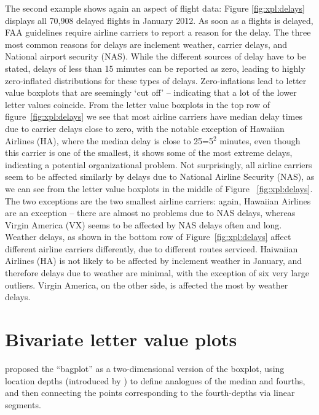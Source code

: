 \documentclass[12pt,oneside]{article}
\begin{document}
The second example shows again an aspect of flight data: Figure \ref{fig:xpl:delays} displays all 70,908 delayed flights in January 2012. As soon as a flights is delayed, FAA guidelines require airline carriers to report a reason for the delay. The three most common reasons for delays are inclement weather, carrier delays, and National airport security (NAS). While the different sources of delay have to be stated,  delays of  less than 15 minutes can be reported as zero, leading to highly zero-inflated  distributions for these types of delays. Zero-inflations lead to letter value boxplots that are seemingly `cut off' -- indicating that a lot of the lower letter values coincide. From the letter value boxplots in the top row of figure~\ref{fig:xpl:delays} we see that most airline carriers have median delay times due to carrier delays close to zero, with the notable exception of Hawaiian Airlines (HA), where the median delay is close to 25=5$^2$ minutes, even though this carrier is one of the smallest, it shows some of the most extreme delays, indicating a potential organizational problem.
Not surprisingly, all airline carriers seem to be affected similarly by delays due to National Airline Security (NAS), as we can see from the letter value boxplots in the middle of Figure ~\ref{fig:xpl:delays}. The two exceptions are the two smallest airline carriers: again, Hawaiian Airlines are an exception -- there are almost no problems due to NAS delays, whereas Virgin America  (VX) seems to be affected by NAS delays often and long.
Weather delays, as shown in the bottom row of Figure~\ref{fig:xpl:delays} affect different airline carriers differently, due to different routes serviced. Haiwaiian Airlines (HA) is not likely to be affected by inclement weather in January, and therefore delays due to weather are minimal, with the exception of six very large outliers. Virgin America, on the other side, is affected the most by weather delays.


\section{Bivariate letter value plots}
\label{sec:bivariate}

\citet{bagplots} proposed the ``bagplot'' as a two-dimensional version of the boxplot, using location depths (introduced by \citet{tukey75}) to define analogues of the median and fourths, and then connecting the points corresponding to the fourth-depths via linear segments. 
\end{document}
